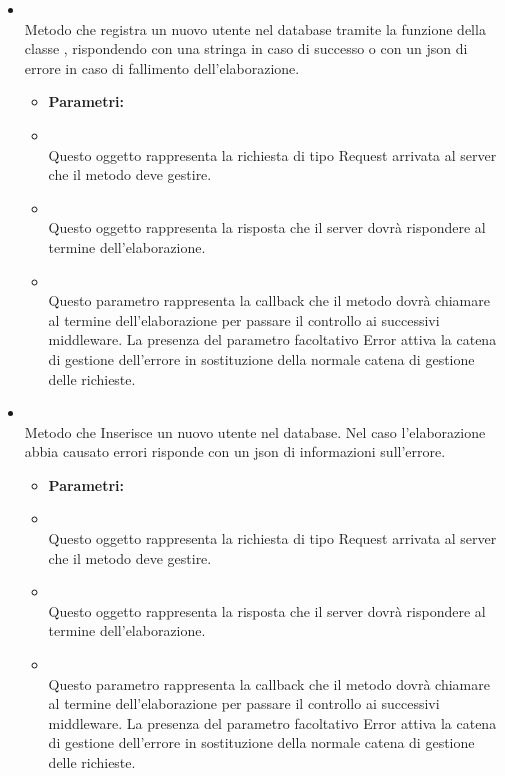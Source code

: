\begin{itemize}
\begin{itemize}
\end{itemize}
\item[] \textbf{} \\ Metodo che registra un nuovo utente nel database tramite la funzione  della classe , rispondendo con una stringa in caso di successo o con un json di errore in caso di fallimento dell'elaborazione.
\begin{itemize}\addtolength{\itemsep}{-0.5\baselineskip}
\item[] \textbf{Parametri:}
\item[]  \\ Questo oggetto rappresenta la richiesta di tipo Request arrivata al server che il metodo deve gestire.
\item[]  \\ Questo oggetto rappresenta la risposta che il server dovrà rispondere al termine dell'elaborazione.
\item[]  \\ Questo parametro rappresenta la callback che il metodo dovrà chiamare al termine dell'elaborazione per passare il controllo ai successivi middleware. La presenza del parametro facoltativo Error attiva la catena di gestione dell'errore in sostituzione della normale catena di gestione delle richieste.
\end{itemize}
\item[] \textbf{} \\ Metodo che Inserisce un nuovo utente nel database. Nel caso l'elaborazione abbia causato errori risponde con un json di informazioni sull'errore.
\begin{itemize}\addtolength{\itemsep}{-0.5\baselineskip}
\item[] \textbf{Parametri:}
\item[]  \\ Questo oggetto rappresenta la richiesta di tipo Request arrivata al server che il metodo deve gestire.
\item[]  \\ Questo oggetto rappresenta la risposta che il server dovrà rispondere al termine dell'elaborazione.
\item[]  \\ Questo parametro rappresenta la callback che il metodo dovrà chiamare al termine dell'elaborazione per passare il controllo ai successivi middleware. La presenza del parametro facoltativo Error attiva la catena di gestione dell'errore in sostituzione della normale catena di gestione delle richieste.

\end{itemize}
\end{itemize}
